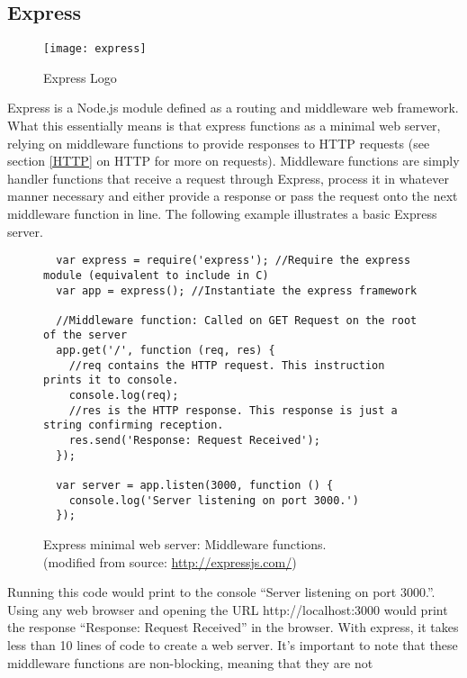 \subsection{Express} \label{express}
\begin{figure}[H]
  \begin{center}
    \texttt{[image: express]}
  \end{center}
  \caption{Express Logo}
\end{figure}
Express is a Node.js module defined as a routing and middleware web framework. What this essentially means is that express functions as
a minimal web server, relying on middleware functions to provide responses to HTTP requests (see section \ref{HTTP} on HTTP for more on
requests). Middleware functions are simply handler functions that receive a request through Express, process it in whatever manner
necessary and either provide a response or pass the request onto the next middleware function in line. The following example illustrates
a basic Express server.
\begin{figure}[H]
  \centering
  \captionsetup{justification=centering}
  \begin{verbatim}
  var express = require('express'); //Require the express module (equivalent to include in C)
  var app = express(); //Instantiate the express framework 

  //Middleware function: Called on GET Request on the root of the server
  app.get('/', function (req, res) {
    //req contains the HTTP request. This instruction prints it to console.
    console.log(req);
    //res is the HTTP response. This response is just a string confirming reception.
    res.send('Response: Request Received');
  });

  var server = app.listen(3000, function () {
    console.log('Server listening on port 3000.')
  });
  \end{verbatim}
  \caption{Express minimal web server: Middleware functions.\\(modified from source: \url{http://expressjs.com/})}
\end{figure}
Running this code would print to the console ``Server listening on port 3000.''. Using any web browser and opening the URL
http://localhost:3000 would print the response ``Response: Request Received'' in the browser. With express, it takes less than 10 lines
of code to create a web server. It's important to note that these middleware functions are non-blocking, meaning that they are not
